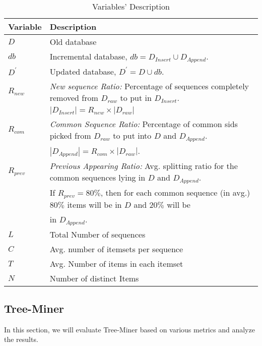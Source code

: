 \begin{table*}[!t]
\centering
\begin{tabular}{|l|l|}
\hline
Variable & Description\\ \hline 
$D$ & Old database \\ \hline
$db$ & Incremental database, $db=D_{Insert} \cup D_{Append}$. \\ \hline
$D^{\prime}$ & Updated database, $D^{\prime}=D \cup db$.\\ \hline
$R_{new}$ & \textit{New sequence Ratio: }Percentage of sequences completely removed from $D_{raw}$ to put in $D_{Insert}$.\\
&   $|D_{Insert}|=R_{new} \times |D_{raw}|$\\
\hline
$R_{com}$ & \textit{Common Sequence Ratio: }Percentage of common sids picked from $D_{raw}$ to put into $D$ and $D_{Append}$.  \\
& $|D_{Append}| = R_{com} \times |D_{raw}|$.\\ 
\hline
$R_{prev}$ & \textit{Previous Appearing Ratio: }Avg. splitting ratio for the common sequences lying in  $D$ and $D_{Append}$. \\
& If $R_{prev}=80\%$, then for each common sequence (in avg.) $80\%$ items will be in $D$ and $20\%$ will be \\
& in $D_{Append}$. \\
\hline
$L$ & Total Number of sequences\\ \hline
$C$ & Avg. number of itemsets per sequence \\ \hline 
$T$ & Avg. Number of items in each itemset \\ \hline 
$N$ & Number of distinct Items \\ \hline
\end{tabular}
\caption{Variables' Description}
\label{table:variables_description}
\end{table*}




\subsection{Tree-Miner}
In this section, we will evaluate Tree-Miner based on various metrics and analyze the results. 

